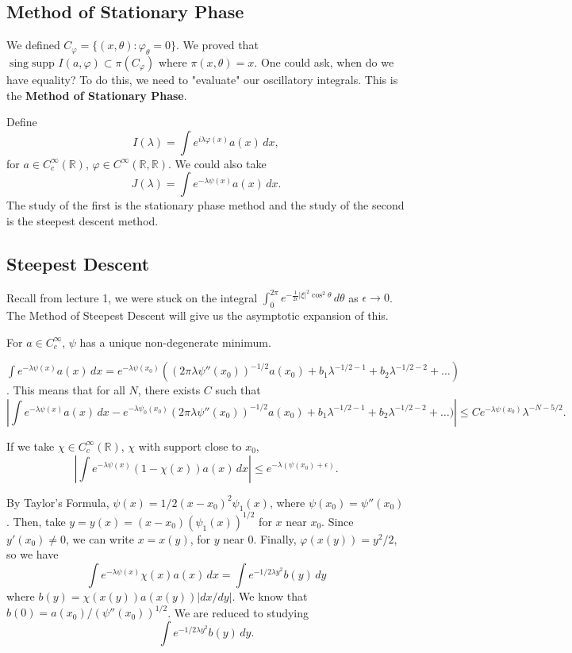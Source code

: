 \documentclass[12pt]{scrartcl}
\newcommand{\R}{\mathbb{R}}
\newcommand{\<}{\langle}
\renewcommand{\>}{\rangle}
\let \phi \varphi
\newcommand{\supp}{\text{supp }}
\begin{document}
\subsection{Method of Stationary Phase}
We defined $C_\phi = \{(x, \theta) : \phi_\theta =0 \}$.  We proved that $\operatorname{sing}\supp I(a, \phi) \subset \pi(C_\phi)$ where $\pi(x, \theta) = x$.  One could ask, when do we have equality?  To do this, we need to "evaluate" our oscillatory integrals.  This is the \textbf{Method of Stationary Phase}.



Define $$I(\lambda) = \int e^{i \lambda \phi(x)}a(x)\,dx,$$ for $a \in C_c^\infty(\R)$, $\phi \in C^\infty(\R, \R)$.  We could also take
$$J(\lambda) = \int e^{-\lambda \psi(x)} a(x)\,dx.$$
The study of the first is the stationary phase method and the study of the second is the steepest descent method.

\subsection{Steepest Descent}
Recall from lecture 1, we were stuck on the integral $\int_0^{2\pi} e^{-\frac{1}{2\epsilon} |\xi|^2 \cos^2 \theta} \,d\theta$ as $\epsilon \to 0$.  The Method of Steepest Descent will give us the asymptotic expansion of this.   

For $a \in C_c^\infty$, $\psi$ has a unique non-degenerate minimum. 

$\int e^{-\lambda \psi(x)}a(x) \,dx = e^{-\lambda \psi(x_0)}((2 \pi \lambda \psi ''(x_0) )^{-1/2} a(x_0) + b_1 \lambda^{-1/2 - 1} + b_2 \lambda^{-1/2 - 2} + \dots)$.  This means that for all $N$, there exists $C$ such that 
$$| \int e^{-\lambda \psi(x)} a(x)\,dx - e^{-\lambda \psi_0(x_0)}(2 \pi \lambda \psi ''(x_0) )^{-1/2} a(x_0) + b_1 \lambda^{-1/2 - 1} + b_2 \lambda^{-1/2 - 2} + \dots )| \le Ce^{-\lambda \psi(x_0)} \lambda^{-N - 5/2}.$$  

If we take $\chi \in C_c^\infty(\R)$, $\chi$ with support close to $x_0$, 
$$|\int e^{-\lambda \psi(x)}(1 - \chi(x)) a(x)\,dx| \le  e^{-\lambda(\psi(x_0) + \epsilon)}.$$

By Taylor's Formula, $\psi(x) = 1/2(x - x_0)^2 \psi_1(x)$, where $\psi(x_0) = \psi''(x_0)$.  Then, take $y = y(x) = (x - x_0) (\psi_1(x))^{1/2}$ for $x$ near $x_0$.  Since $y'(x_0) \ne 0$, we can write $x = x(y)$, for $y$ near 0.  Finally, $\phi(x(y)) = y^2/2$, so we have
$$\int e^{-\lambda \psi(x)} \chi(x) a(x)\,dx = \int e^{-1/2 \lambda y^2}b(y)\,dy$$
where $b(y) = \chi(x(y)) a(x(y)) |dx/dy|$.  We know that $b(0) = a(x_0)/(\psi''(x_0))^{1/2}$.  We are reduced to studying 
$$\int e^{-1/2 \lambda y^2} b(y)\,dy.$$
\end{document}
